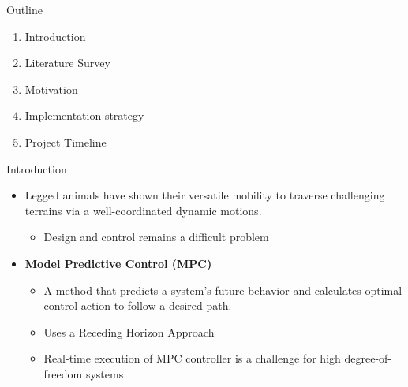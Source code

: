 \documentclass{beamer}
\begin{document}
\begin{frame}\titlepage\end{frame}\normalfont


\begin{frame}{Outline}
	\begin{enumerate}
		\item Introduction
		\item Literature Survey
		\item Motivation
		\item Implementation strategy
		\item Project Timeline
	\end{enumerate}
\end{frame}\normalfont


\begin{frame}{Introduction}
        \setlength{\itemsep}{1em}
	\setlength{\parskip}{2pt}
	\begin{itemize}\small
            \item Legged animals have shown their versatile mobility to traverse challenging terrains via a well-coordinated dynamic motions.
                \begin{itemize}\scriptsize
                    \item Design and control remains a difficult problem
                \end{itemize}
		\item \textbf{Model Predictive Control (MPC)}
                \begin{itemize}\scriptsize
                    \item A method that predicts a system's future behavior and calculates optimal control action to follow a desired path.
                    \item Uses a Receding Horizon Approach
                    \item Real-time execution of MPC controller is a challenge for high degree-of-freedom systems
                \end{itemize}
	\end{itemize}
\end{frame}\normalfont
\end{document}
